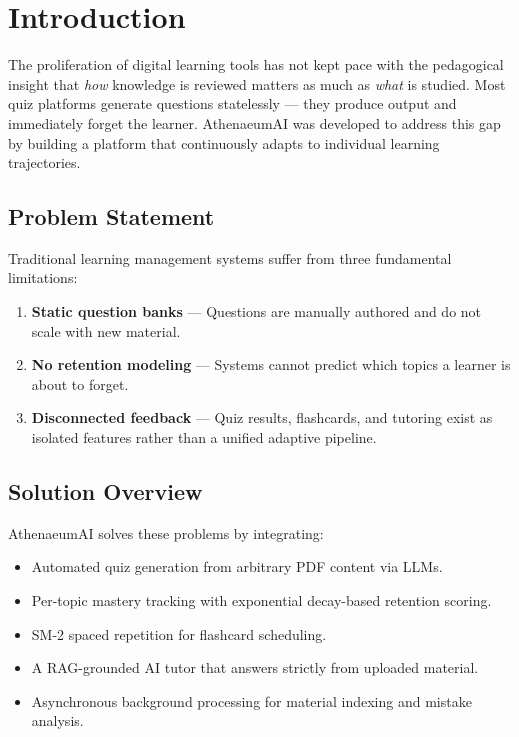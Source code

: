 \documentclass[12pt,a4paper]{article}
\begin{document}
\vspace{1cm}
\tableofcontents
\newpage
\onehalfspacing

\section{Introduction}

The proliferation of digital learning tools has not kept pace with the pedagogical insight that \textit{how} knowledge is reviewed matters as much as \textit{what} is studied. Most quiz platforms generate questions statelessly --- they produce output and immediately forget the learner. AthenaeumAI was developed to address this gap by building a platform that continuously adapts to individual learning trajectories.

\subsection{Problem Statement}
Traditional learning management systems suffer from three fundamental limitations:
\begin{enumerate}[leftmargin=1.5cm]
    \item \textbf{Static question banks} --- Questions are manually authored and do not scale with new material.
    \item \textbf{No retention modeling} --- Systems cannot predict which topics a learner is about to forget.
    \item \textbf{Disconnected feedback} --- Quiz results, flashcards, and tutoring exist as isolated features rather than a unified adaptive pipeline.
\end{enumerate}

\subsection{Solution Overview}
AthenaeumAI solves these problems by integrating:
\begin{itemize}[leftmargin=1.5cm]
    \item Automated quiz generation from arbitrary PDF content via LLMs.
    \item Per-topic mastery tracking with exponential decay-based retention scoring.
    \item SM-2 spaced repetition for flashcard scheduling.
    \item A RAG-grounded AI tutor that answers strictly from uploaded material.
    \item Asynchronous background processing for material indexing and mistake analysis.
\end{itemize}
\end{document}
